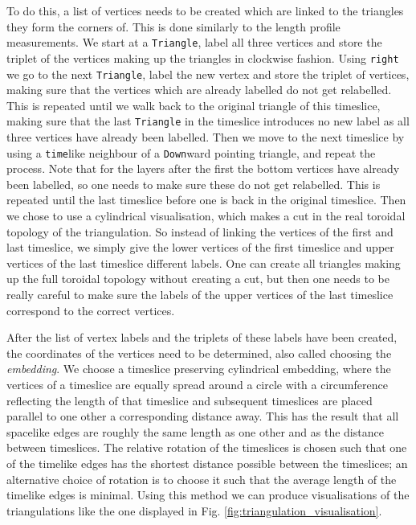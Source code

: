 To do this, a list of vertices needs to be created which are linked to the triangles they form the corners of.
This is done similarly to the length profile measurements.
We start at a \verb|Triangle|, label all three vertices and store the triplet of the vertices making up the triangles in clockwise fashion.
Using \verb|right| we go to the next \verb|Triangle|, label the new vertex and store the triplet of vertices, making sure that the vertices which are already labelled do not get relabelled.
This is repeated until we walk back to the original triangle of this timeslice, making sure that the last \verb|Triangle| in the timeslice introduces no new label as all three vertices have already been labelled.
Then we move to the next timeslice by using a \verb|time|like neighbour of a \verb|Down|ward pointing triangle, and repeat the process.
Note that for the layers after the first the bottom vertices have already been labelled, so one needs to make sure these do not get relabelled.
This is repeated until the last timeslice before one is back in the original timeslice.
Then we chose to use a cylindrical visualisation, which makes a cut in the real toroidal topology of the triangulation. So instead of linking the vertices of the first and last timeslice, we simply give the lower vertices of the first timeslice and upper vertices of the last timeslice different labels.
One can create all triangles making up the full toroidal topology without creating a cut, but then one needs to be really careful to make sure the labels of the upper vertices of the last timeslice correspond to the correct vertices.

After the list of vertex labels and the triplets of these labels have been created, the coordinates of the vertices need to be determined, also called choosing the \emph{embedding}.
We choose a timeslice preserving cylindrical embedding, where the vertices of a timeslice are equally spread around a circle with a circumference reflecting the length of that timeslice and subsequent timeslices are placed parallel to one other a corresponding distance away.
This has the result that all spacelike edges are roughly the same length as one other and as the distance between timeslices. The relative rotation of the timeslices is chosen such that one of the timelike edges has the shortest distance possible between the timeslices; an alternative choice of rotation is to choose it such that the average length of the timelike edges is minimal.
Using this method we can produce visualisations of the triangulations like the one
displayed in Fig. \ref{fig:triangulation_visualisation}.

